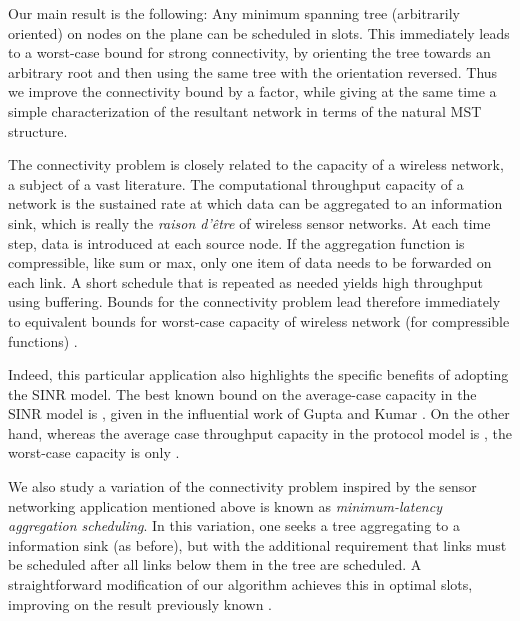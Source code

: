 \documentclass[11pt]{amsart}
\begin{document}
Our main result is the following: Any minimum spanning tree
(arbitrarily oriented) on  nodes on the plane can be scheduled in
 slots. This immediately leads to a  worst-case
bound for strong connectivity, by orienting the tree towards an arbitrary
root and then using the same tree with the orientation reversed.
Thus we improve the connectivity bound by a  factor, while 
giving at the same time a simple characterization of the resultant network in
terms of the natural MST structure.

The connectivity problem is closely related to the capacity of a
wireless network, a subject of a vast literature.
The computational throughput capacity of a network is the sustained
rate at which data can be aggregated to an information sink, which is
really the \emph{raison d'\^etre} of wireless sensor networks.  
At each time step, data is introduced at each source node.
If the aggregation function is compressible, like sum or max, 
only one item of data needs to be forwarded on each link.
A short schedule that is repeated as needed yields high throughput using buffering.  
Bounds for the connectivity problem lead therefore immediately to
equivalent bounds for worst-case capacity of wireless network (for
compressible functions) \cite{Moscibroda07}.

\iffalse
Apart from being the most basic and important network structure,
wireless connectivity immediately leads to interesting
applications. To highlight just one, connectivity structures provide
bounds for worst-case capacity in wireless sensor data gathering
applications. 
The computational throughput capacity of a network is the sustained
rate at which data can be aggregated to an information sink, which is
really the \emph{raison d'\^etre} of wireless sensor networks.  Bounds
for the the connectivity problem immediately lead to equivalent bounds
for the data aggregation problem (for compressible functions like sum
and max) \cite{Moscibroda07}.
\fi

Indeed, this particular application also 
highlights the specific benefits of adopting the SINR model.  The best
known bound on the average-case capacity in the SINR model is
, given in the influential work of Gupta and Kumar
\cite{Kumar00}.  On the other
hand, whereas the average case throughput capacity in the protocol model is
 \cite{Kumar00}, the worst-case capacity
is only  \cite{Moscibroda07}.

We also study a variation of the connectivity problem inspired by the
sensor networking application mentioned above is known as
\emph{minimum-latency aggregation scheduling}. In this variation, one
seeks a tree aggregating to a information sink (as before), but with
the additional requirement that links must be scheduled after all
links below them in the tree are scheduled.  
A straightforward modification of our algorithm achieves this in
optimal  slots, improving on the  result previously known \cite{Li:2010:MAS:1868521.1868581}.
\end{document}
